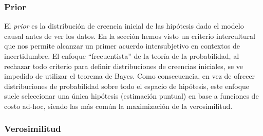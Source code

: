 \documentclass[a4paper,10pt]{book}
\theoremstyle{definition}
\begin{document}
\subsubsection*{Prior}

El \emph{prior} es la distribuci\'on de creencia inicial de las hip\'otesis dado el modelo causal antes de ver los datos.
%
En la secci\'on \emph{} hemos visto un criterio intercultural que nos permite alcanzar un primer acuerdo intersubjetivo en contextos de incertidumbre.
%
El enfoque ``frecuentista'' de la teor\'ia de la probabilidad, al rechazar todo criterio para definir distribuciones de creencias iniciales, se ve impedido de utilizar el teorema de Bayes.
%
Como consecuencia, en vez de ofrecer distribuciones de probabilidad sobre todo el espacio de hip\'otesis, este enfoque suele seleccionar una \'unica hip\'otesis (estimaci\'on puntual) en base a funciones de costo ad-hoc, siendo las m\'as com\'un la maximizaci\'on de la verosimilitud.

\subsubsection*{Verosimilitud}
\end{document}
